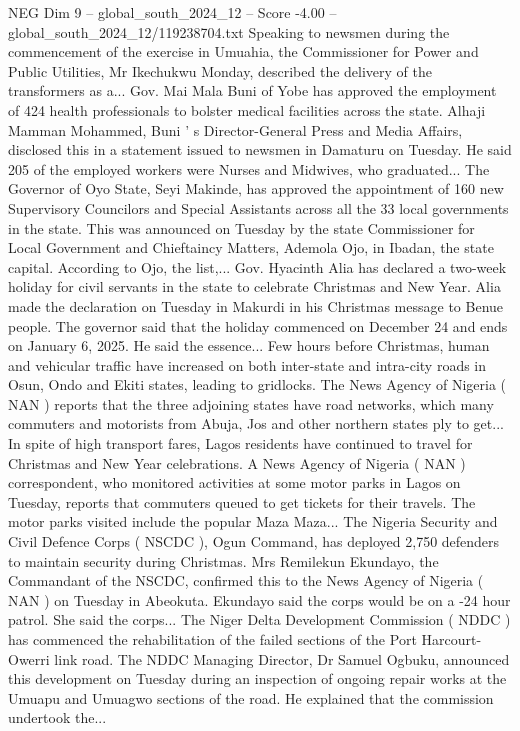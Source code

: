 \begin{textsample}{NEG Dim 9 – global\_south\_2024\_12 – Score -4.00 – global\_south\_2024\_12/119238704.txt}
Speaking to newsmen during the commencement of the exercise in Umuahia, the Commissioner for Power and Public Utilities, Mr Ikechukwu Monday, described the delivery of the transformers as a...
Gov.
Mai Mala Buni of Yobe has approved the employment of 424 health professionals to bolster medical facilities across the state.
Alhaji Mamman Mohammed, Buni ' s Director-General Press and Media Affairs, disclosed this in a statement issued to newsmen in Damaturu on Tuesday.
He said 205 of the employed workers were Nurses and Midwives, who graduated...
The Governor of Oyo State, Seyi Makinde, has approved the appointment of 160 new Supervisory Councilors and Special Assistants across all the 33 local governments in the state.
This was announced on Tuesday by the state Commissioner for Local Government and Chieftaincy Matters, Ademola Ojo, in Ibadan, the state capital.
According to Ojo, the list,...
Gov.
Hyacinth Alia has declared a two-week holiday for civil servants in the state to celebrate Christmas and New Year.
Alia made the declaration on Tuesday in Makurdi in his Christmas message to Benue people.
The governor said that the holiday commenced on December 24 and ends on January 6, 2025.
He said the essence...
Few hours before Christmas, human and vehicular traffic have increased on both inter-state and intra-city roads in Osun, Ondo and Ekiti states, leading to gridlocks.
The News Agency of Nigeria ( NAN ) reports that the three adjoining states have road networks, which many commuters and motorists from Abuja, Jos and other northern states ply to get...
In spite of high transport fares, Lagos residents have continued to travel for Christmas and New Year celebrations.
A News Agency of Nigeria ( NAN ) correspondent, who monitored activities at some motor parks in Lagos on Tuesday, reports that commuters queued to get tickets for their travels.
The motor parks visited include the popular Maza Maza...
The Nigeria Security and Civil Defence Corps ( NSCDC ), Ogun Command, has deployed 2,750 defenders to maintain security during Christmas.
Mrs Remilekun Ekundayo, the Commandant of the NSCDC, confirmed this to the News Agency of Nigeria ( NAN ) on Tuesday in Abeokuta.
Ekundayo said the corps would be on a -24 hour patrol.
She said the corps...
The Niger Delta Development Commission ( NDDC ) has commenced the rehabilitation of the failed sections of the Port Harcourt-Owerri link road.
The NDDC Managing Director, Dr Samuel Ogbuku, announced this development on Tuesday during an inspection of ongoing repair works at the Umuapu and Umuagwo sections of the road.
He explained that the commission undertook the...

\end{textsample}
